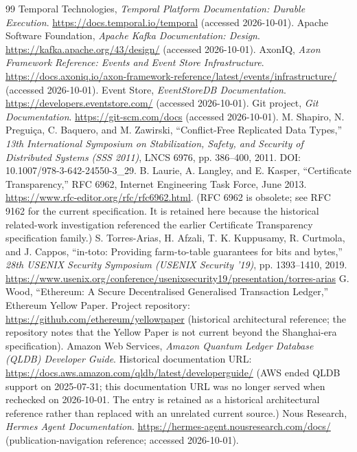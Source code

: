 \documentclass[11pt]{article}
\begin{document}
\begin{thebibliography}{99}
 Temporal Technologies, \textit{Temporal Platform Documentation: Durable Execution}. \url{https://docs.temporal.io/temporal} (accessed 2026-10-01).
 Apache Software Foundation, \textit{Apache Kafka Documentation: Design}. \url{https://kafka.apache.org/43/design/} (accessed 2026-10-01).
 AxonIQ, \textit{Axon Framework Reference: Events and Event Store Infrastructure}. \url{https://docs.axoniq.io/axon-framework-reference/latest/events/infrastructure/} (accessed 2026-10-01).
 Event Store, \textit{EventStoreDB Documentation}. \url{https://developers.eventstore.com/} (accessed 2026-10-01).
 Git project, \textit{Git Documentation}. \url{https://git-scm.com/docs} (accessed 2026-10-01).
 M. Shapiro, N. Preguiça, C. Baquero, and M. Zawirski, “Conflict-Free Replicated Data Types,” \textit{13th International Symposium on Stabilization, Safety, and Security of Distributed Systems (SSS 2011)}, LNCS 6976, pp. 386--400, 2011. DOI: 10.1007/978-3-642-24550-3\_29.
 B. Laurie, A. Langley, and E. Kasper, “Certificate Transparency,” RFC 6962, Internet Engineering Task Force, June 2013. \url{https://www.rfc-editor.org/rfc/rfc6962.html}. (RFC 6962 is obsolete; see RFC 9162 for the current specification. It is retained here because the historical related-work investigation referenced the earlier Certificate Transparency specification family.)
 S. Torres-Arias, H. Afzali, T. K. Kuppusamy, R. Curtmola, and J. Cappos, “in-toto: Providing farm-to-table guarantees for bits and bytes,” \textit{28th USENIX Security Symposium (USENIX Security ’19)}, pp. 1393--1410, 2019. \url{https://www.usenix.org/conference/usenixsecurity19/presentation/torres-arias}
 G. Wood, “Ethereum: A Secure Decentralised Generalised Transaction Ledger,” Ethereum Yellow Paper. Project repository: \url{https://github.com/ethereum/yellowpaper} (historical architectural reference; the repository notes that the Yellow Paper is not current beyond the Shanghai-era specification).
 Amazon Web Services, \textit{Amazon Quantum Ledger Database (QLDB) Developer Guide}. Historical documentation URL: \url{https://docs.aws.amazon.com/qldb/latest/developerguide/} (AWS ended QLDB support on 2025-07-31; this documentation URL was no longer served when rechecked on 2026-10-01. The entry is retained as a historical architectural reference rather than replaced with an unrelated current source.)
 Nous Research, \textit{Hermes Agent Documentation}. \url{https://hermes-agent.nousresearch.com/docs/} (publication-navigation reference; accessed 2026-10-01).

\end{thebibliography}
\end{document}
